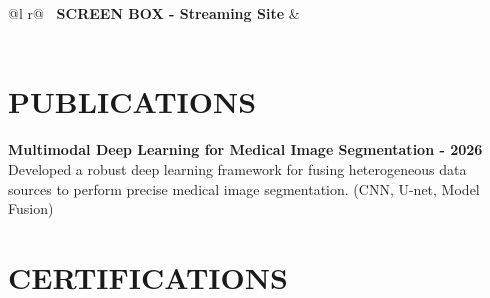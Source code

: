 \documentclass[a4paper,12pt]{article}
\begin{document}
\begin{tabularx}{\linewidth}{ @{}l r@{} }
\textbf{\textbullet\ SCREEN BOX - Streaming Site} & \hfill \href{https://screen-box.vercel.app/}{\hspace{0.5em} \faLight\faLink} \\[3.75pt]
  \\
\end{tabularx}




















\section{PUBLICATIONS}
\textbf{Multimodal Deep Learning for Medical Image Segmentation - 2026}
\newline
Developed a robust deep learning framework for fusing heterogeneous data sources to perform precise medical image segmentation. (CNN, U-net, Model Fusion)










\section{CERTIFICATIONS}
\vspace{-8pt} 
\end{document}
